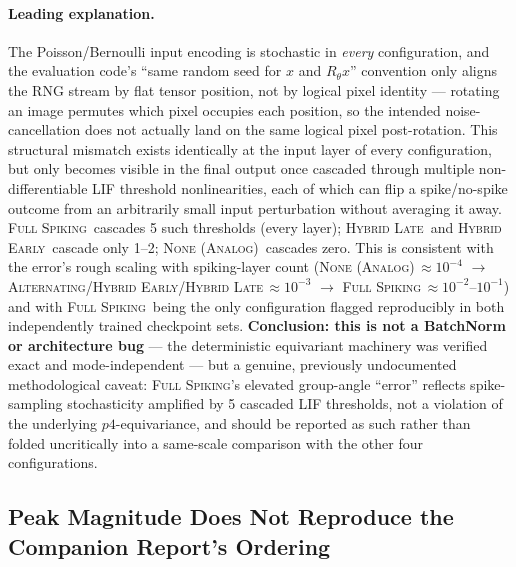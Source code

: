 \documentclass[11pt]{article}
\newcommand{\None}{\textsc{None (Analog)}}
\newcommand{\Alternating}{\textsc{Alternating}}
\newcommand{\FullSpiking}{\textsc{Full Spiking}}
\newcommand{\HybridLate}{\textsc{Hybrid Late}}
\newcommand{\HybridEarly}{\textsc{Hybrid Early}}
\begin{document}
\paragraph{Leading explanation.} The Poisson/Bernoulli input encoding is stochastic in \emph{every}
configuration, and the evaluation code's ``same random seed for $x$ and $R_\theta x$'' convention only
aligns the RNG stream by flat tensor position, not by logical pixel identity --- rotating an image
permutes which pixel occupies each position, so the intended noise-cancellation does not actually land
on the same logical pixel post-rotation. This structural mismatch exists identically at the input layer
of every configuration, but only becomes visible in the final output once cascaded through multiple
non-differentiable LIF threshold nonlinearities, each of which can flip a spike/no-spike outcome from
an arbitrarily small input perturbation without averaging it away. \FullSpiking\ cascades 5 such
thresholds (every layer); \HybridLate\ and \HybridEarly\ cascade only 1--2; \None\ cascades zero. This
is consistent with the error's rough scaling with spiking-layer count (\None$\,\approx 10^{-4}$
$\to$ \Alternating/\HybridEarly/\HybridLate$\,\approx 10^{-3}$ $\to$ \FullSpiking$\,\approx
10^{-2}$--$10^{-1}$) and with \FullSpiking\ being the only configuration flagged reproducibly in both
independently trained checkpoint sets. \textbf{Conclusion: this is not a BatchNorm or architecture
bug} --- the deterministic equivariant machinery was verified exact and mode-independent --- but a
genuine, previously undocumented methodological caveat: \FullSpiking's elevated group-angle
``error'' reflects spike-sampling stochasticity amplified by 5 cascaded LIF thresholds, not a
violation of the underlying $p4$-equivariance, and should be reported as such rather than folded
uncritically into a same-scale comparison with the other four configurations.

\subsection{Peak Magnitude Does Not Reproduce the Companion Report's Ordering}
\end{document}
